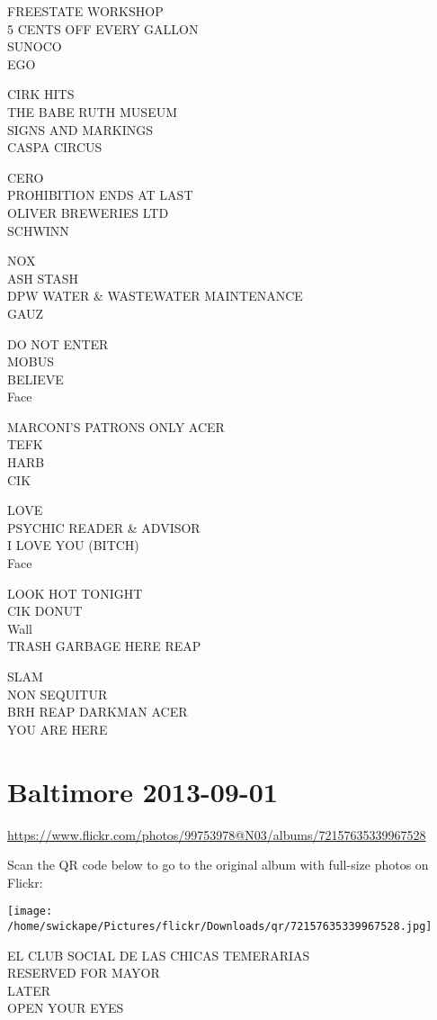 \documentclass[10pt,letterpaper]{article}
\begin{document}
FREESTATE WORKSHOP\\
5 CENTS OFF EVERY GALLON\\
SUNOCO\\
EGO

CIRK HITS\\
THE BABE RUTH MUSEUM\\
SIGNS AND MARKINGS\\
CASPA CIRCUS

CERO\\
PROHIBITION ENDS AT LAST\\
OLIVER BREWERIES LTD\\
SCHWINN

NOX\\
ASH STASH\\
DPW WATER \& WASTEWATER MAINTENANCE\\
GAUZ

DO NOT ENTER\\
MOBUS\\
BELIEVE\\
Face

MARCONI'S PATRONS ONLY ACER\\
TEFK\\
HARB\\
CIK

LOVE\\
PSYCHIC READER \& ADVISOR\\
I LOVE YOU (BITCH)\\
Face

LOOK HOT TONIGHT\\
CIK DONUT\\
Wall\\
TRASH GARBAGE HERE REAP

SLAM\\
NON SEQUITUR\\
BRH REAP DARKMAN ACER\\
YOU ARE HERE


\section*{Baltimore 2013-09-01}

\url{https://www.flickr.com/photos/99753978@N03/albums/72157635339967528}

Scan the QR code below to go to the original album with full-size photos on Flickr:

\texttt{[image: /home/swickape/Pictures/flickr/Downloads/qr/72157635339967528.jpg]}


EL CLUB SOCIAL DE LAS CHICAS TEMERARIAS\\
RESERVED FOR MAYOR\\
LATER\\
OPEN YOUR EYES
\end{document}
